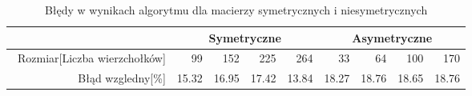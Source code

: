 \begin{table}
\begin{tabular}{|r|r|r|r|r|r|r|r|r|}
\hline
 & \multicolumn{4}{|c|}{Symetryczne} & \multicolumn{4}{|c|}{Asymetryczne} \\ \hline\
Rozmiar[Liczba wierzchołków] & 99 & 152 & 225 & 264 & 33 & 64 & 100 & 170 \\ \hline
Błąd wzgledny[\%] & 15.32 & 16.95 & 17.42 & 13.84 & 18.27 & 18.76 & 18.65 & 18.76 \\ \hline
\end{tabular}
\caption{Błędy w wynikach algorytmu dla macierzy symetrycznych i niesymetrycznych}
\label{tab:error_TsInsert}
\end{table}
